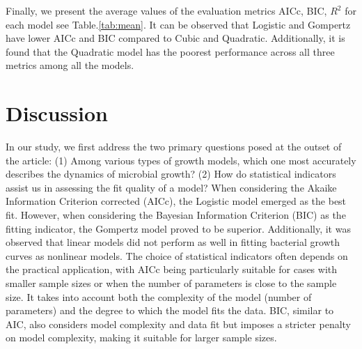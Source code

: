 \documentclass[11pt]{article}
\begin{document}
\begin{linenumbers}
    Finally, we present the average values of the evaluation metrics AICc, BIC, $R^2$ for each model see Table.\ref{tab:mean}. It can be observed that Logistic and Gompertz have lower AICc and BIC compared to Cubic and Quadratic. Additionally, it is found that the Quadratic model has the poorest performance across all three metrics among all the models.


    \section{Discussion}
In our study, we first address the two primary questions posed at the outset of the article: (1) Among various types of growth models, which one most accurately describes the dynamics of microbial growth? (2) How do statistical indicators assist us in assessing the fit quality of a model? When considering the Akaike Information Criterion corrected (AICc), the Logistic model emerged as the best fit. However, when considering the Bayesian Information Criterion (BIC) as the fitting indicator, the Gompertz model proved to be superior. Additionally, it was observed that linear models did not perform as well in fitting bacterial growth curves as nonlinear models. The choice of statistical indicators often depends on the practical application, with AICc being particularly suitable for cases with smaller sample sizes or when the number of parameters is close to the sample size. It takes into account both the complexity of the model (number of parameters) and the degree to which the model fits the data. BIC, similar to AIC, also considers model complexity and data fit but imposes a stricter penalty on model complexity, making it suitable for larger sample sizes.


\end{linenumbers}
\end{document}
